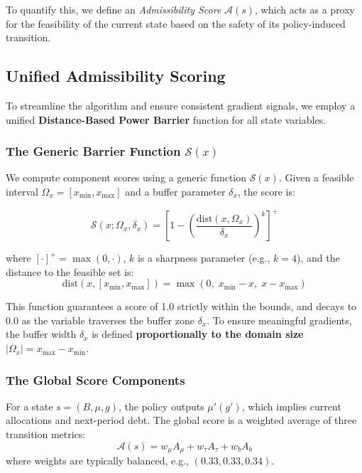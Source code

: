To quantify this, we define an \textit{Admissibility Score} $\mathcal{A}(s)$, which acts as a proxy for the feasibility of the current state based on the safety of its policy-induced transition.

\subsection{Unified Admissibility Scoring}

To streamline the algorithm and ensure consistent gradient signals, we employ a unified \textbf{Distance-Based Power Barrier} function for all state variables.

\subsubsection{The Generic Barrier Function $\mathcal{S}(x)$}
We compute component scores using a generic function $\mathcal{S}(x)$. Given a feasible interval $\Omega_x = [x_{\min}, x_{\max}]$ and a buffer parameter $\delta_x$, the score is:

\begin{equation}
    \mathcal{S}(x; \Omega_x, \delta_x) = \left[ 1 - \left( \frac{\text{dist}(x, \Omega_x)}{\delta_x} \right)^k \right]^+
\end{equation}

where $[ \cdot ]^+ = \max(0, \cdot)$, $k$ is a sharpness parameter (e.g., $k=4$), and the distance to the feasible set is:
\begin{equation}
    \text{dist}(x, [x_{\min}, x_{\max}]) = \max\left(0, \; x_{\min} - x, \; x - x_{\max}\right)
\end{equation}

This function guarantees a score of 1.0 strictly within the bounds, and decays to 0.0 as the variable traverses the buffer zone $\delta_x$. To ensure meaningful gradients, the buffer width $\delta_x$ is defined \textbf{proportionally to the domain size} $|\Omega_x| = x_{\max} - x_{\min}$.

\subsubsection{The Global Score Components}
For a state $s=(B, \mu, g)$, the policy outputs $\mu'(g')$, which implies current allocations and next-period debt. The global score is a weighted average of three transition metrics:
\begin{equation}
    \mathcal{A}(s) = w_{\mu} A_{\mu} + w_{\tau} A_{\tau} + w_{b} A_{b}
\end{equation}
where weights are typically balanced, e.g., $(0.33, 0.33, 0.34)$.

